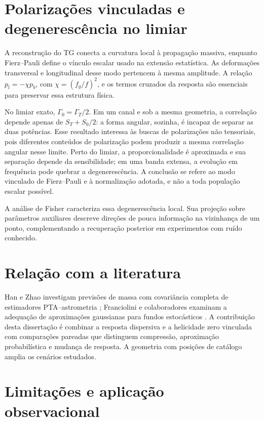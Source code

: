 \section{Polarizações vinculadas e degenerescência no limiar}

A reconstrução do TG conecta a curvatura local à propagação massiva, enquanto Fierz--Pauli define o vínculo escalar usado na extensão estatística. As deformações transversal e longitudinal desse modo pertencem à mesma amplitude. A relação $p_l=-\chi p_b$, com $\chi=(f_g/f)^2$, e os termos cruzados da resposta são essenciais para preservar essa estrutura física.

No limiar exato, $\Gamma_0=\Gamma_T/2$. Em um canal e sob a mesma geometria, a correlação depende apenas de $S_T+S_0/2$: a forma angular, sozinha, é incapaz de separar as duas potências. Esse resultado interessa às buscas de polarizações não tensoriais, pois diferentes conteúdos de polarização podem produzir a mesma correlação angular nesse limite. Perto do limiar, a proporcionalidade é aproximada e sua separação depende da sensibilidade; em uma banda extensa, a evolução em frequência pode quebrar a degenerescência. A conclusão se refere ao modo vinculado de Fierz--Pauli e à normalização adotada, e não a toda população escalar possível.

A análise de Fisher caracteriza essa degenerescência local. Sua projeção sobre parâmetros auxiliares descreve direções de pouca informação na vizinhança de um ponto, complementando a recuperação posterior em experimentos com ruído conhecido.

\section{Relação com a literatura}

Han e Zhao investigam previsões de massa com covariância completa de estimadores PTA--astrometria \autocite{han2026}; Franciolini e colaboradores examinam a adequação de aproximações gaussianas para fundos estocásticos \autocite{franciolini2025}. A contribuição desta dissertação é combinar a resposta dispersiva e a helicidade zero vinculada com comparações pareadas que distinguem compressão, aproximação probabilística e mudança de resposta. A geometria com posições de catálogo amplia os cenários estudados.

\section{Limitações e aplicação observacional}

